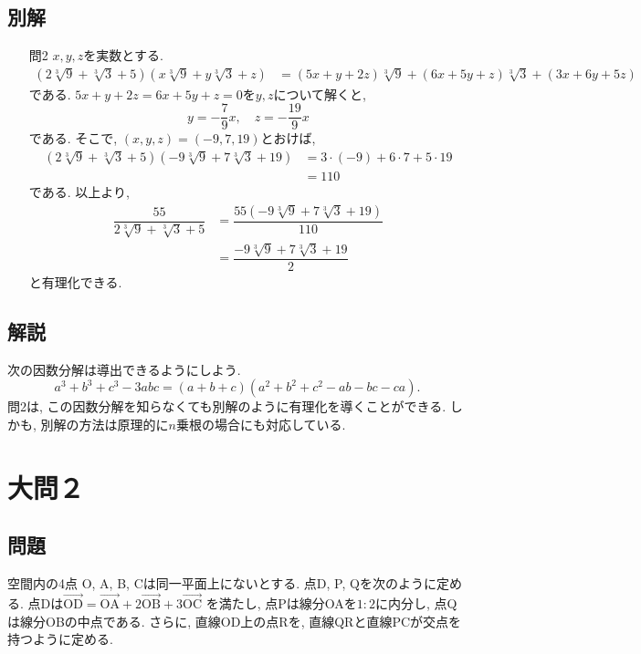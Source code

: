 \documentclass[dvipdfmx,a4paper]{jsarticle}
\newcommand{\posv}[1]{\overrightarrow{\mathrm{#1}}}
\newcommand{\2}{I\hspace{-1pt}I}
\newcommand{\3}{I\hspace{-1pt}I\hspace{-1pt}I}
\begin{document}
    \subsection{別解}
    \begin{itemize}
        \item [問2] $x,y,z$を実数とする. 
        \begin{align*}
            (2 \sqrt[3]{9} + \sqrt[3]{3} + 5)(x \sqrt[3]{9} + y\sqrt[3]{3} + z) 
            &= (5x+y+2z)\sqrt[3]{9} + (6x + 5y + z)\sqrt[3]{3} + (3x + 6y + 5z)
        \end{align*}
        である. $5x+y+2z=6x + 5y + z=0$を$y,z$について解くと, 
        \begin{equation*}
            y = -\dfrac{7}{9}x, \quad z = - \dfrac{19}{9}x
        \end{equation*}
        である. そこで, $(x,y,z)=(-9,7,19)$とおけば, 
        \begin{align*}
            (2 \sqrt[3]{9} + \sqrt[3]{3} + 5)(-9 \sqrt[3]{9} + 7\sqrt[3]{3} + 19) 
            &= 3\cdot (-9) + 6\cdot 7 + 5 \cdot 19 \\
            &= 110
        \end{align*}
        である. 以上より, 
        \begin{align*}
            \dfrac{55}{2 \sqrt[3]{9} + \sqrt[3]{3} + 5}
            &= \dfrac{55(-9 \sqrt[3]{9} + 7 \sqrt[3]{3} + 19)}{110} \\
            &= \dfrac{-9 \sqrt[3]{9} + 7 \sqrt[3]{3} + 19}{2}
        \end{align*}
        と有理化できる. 
    \end{itemize}



    \subsection{解説}
    次の因数分解は導出できるようにしよう. 
    \[
        a^3 + b^3 + c^3 -3abc = (a + b +c)(a^2 + b^2 + c^2 - ab -bc -ca).
    \]
    問2は, この因数分解を知らなくても別解のように有理化を導くことができる. しかも, 
    別解の方法は原理的に$n$乗根の場合にも対応している. 
    
    \section{大問２}
    \subsection{問題}
    空間内の4点 O, A, B, Cは同一平面上にないとする. 点D, P, Qを次のように定める. 
    点Dは$\posv{OD} = \posv{OA} + 2\posv{OB} + 3\posv{OC}$ を満たし,   
    点Pは線分OAを$1 : 2$に内分し, 点Qは線分OBの中点である. さらに,   
    直線OD上の点Rを, 直線QRと直線PCが交点を持つように定める.   
\end{document}
